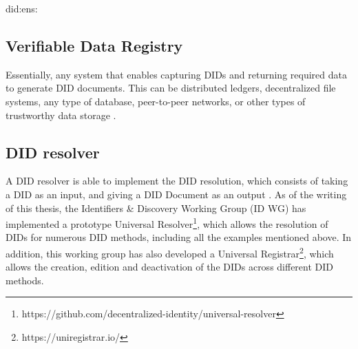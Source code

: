 did:ens:




\subsection{Verifiable Data Registry}

Essentially, any system that enables capturing DIDs and returning required data to generate DID documents. This can be distributed ledgers, decentralized file systems, any type of database, peer-to-peer networks, or other types of trustworthy data storage \cite{sporny_longley_sabadello_reed_steele_2021}.

\subsection{DID resolver}

A DID resolver is able to implement the DID resolution, which consists of taking a DID as an input, and giving a DID Document as an output \cite{sporny_longley_sabadello_reed_steele_2021}. As of the writing of this thesis, the Identifiers \& Discovery Working Group (ID WG) has implemented a prototype Universal Resolver\footnote{https://github.com/decentralized-identity/universal-resolver}, which allows the resolution of DIDs for numerous DID methods, including all the examples mentioned above. In addition, this working group has also developed a Universal Registrar\footnote{https://uniregistrar.io/}, which allows the creation, edition and deactivation of the DIDs across different DID methods.

